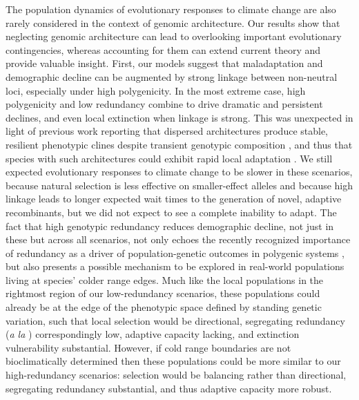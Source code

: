 \documentclass[9pt,twocolumn,twoside,lineno]{pnas-new}
\begin{document}
The population dynamics of evolutionary responses
to climate change are also rarely considered in the context of genomic architecture.
Our results show that neglecting genomic architecture
can lead to overlooking important evolutionary contingencies,
whereas accounting for them can extend current theory and provide valuable insight.
First, our models suggest that maladaptation and demographic decline
can be augmented by strong linkage between non-neutral loci,
especially under high polygenicity. 
In the most extreme case, high polygenicity and low redundancy
combine to drive dramatic and persistent declines,
and even local extinction when linkage is strong.
This was unexpected in light of previous work reporting
that dispersed architectures produce stable,
resilient phenotypic clines despite transient genotypic composition \cite{yeaman_amnat,yeaman_review},
and thus that species with such architectures
could exhibit rapid local adaptation \cite{aitken_yeaman}. 
We still expected evolutionary responses to climate change
to be slower in these scenarios,
because natural selection is less effective on smaller-effect alleles
and because high linkage leads to longer expected wait times to the generation
of novel, adaptive recombinants, but we did not expect
to see a complete inability to adapt.
The fact that high genotypic redundancy reduces demographic decline,
not just in these but across all scenarios,
not only echoes the recently recognized importance of redundancy
as a driver of population-genetic outcomes in polygenic systems
\cite{laruson,yeaman_review},
but also presents a possible mechanism to be explored
in real-world populations living at species' colder range edges.
Much like the local populations in the rightmost region of our low-redundancy scenarios,
these populations could already be at the edge of the phenotypic space defined by
standing genetic variation, such that local selection would be directional,
segregating redundancy (\textit{a la} \cite{laruson}) correspondingly low,
adaptive capacity lacking, and extinction vulnerability substantial.
However, if cold range boundaries are not bioclimatically determined then
these populations could be more similar to our high-redundancy scenarios:
selection would be balancing rather than directional,
segregating redundancy substantial, and thus adaptive capacity more robust.
\end{document}
